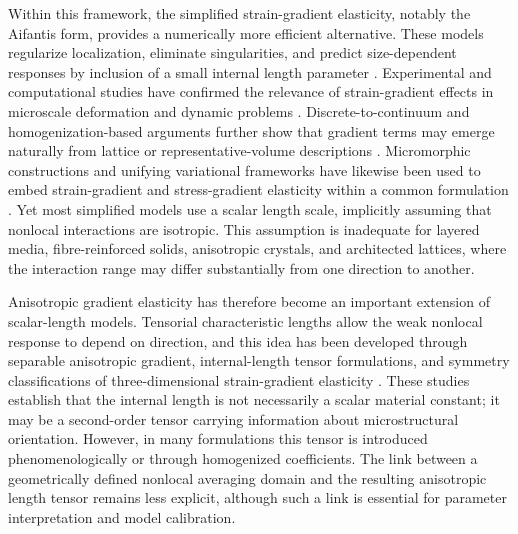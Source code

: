 \documentclass[final,3p,times,fleqn]{elsarticle}
\begin{document}
Within this framework, the simplified strain-gradient elasticity, notably the Aifantis form, provides a numerically more efficient alternative. These models regularize localization, eliminate singularities, and predict size-dependent responses by inclusion of a small internal length parameter \cite{Aifantis1992,RuAifantis1993,AltanAifantis1997}. 
Experimental and computational studies have confirmed the relevance of strain-gradient effects in microscale deformation and dynamic problems \cite{Lam2003,AskesAifantis2011}. Discrete-to-continuum and homogenization-based arguments further show that gradient terms may emerge naturally from lattice or representative-volume descriptions \cite{MetrikineAskes2002,Gitman2005}. Micromorphic constructions and unifying variational frameworks have likewise been used to embed strain-gradient and stress-gradient elasticity within a common formulation \cite{Forest2009,Polizzotto2015}. Yet most simplified models use a scalar length scale, implicitly assuming that nonlocal interactions are isotropic. This assumption is inadequate for layered media, fibre-reinforced solids, anisotropic crystals, and architected lattices, where the interaction range may differ substantially from one direction to another.

Anisotropic gradient elasticity has therefore become an important extension of scalar-length models. Tensorial characteristic lengths allow the weak nonlocal response to depend on direction, and this idea has been developed through separable anisotropic gradient, internal-length tensor formulations, and symmetry classifications of three-dimensional strain-gradient elasticity \cite{LazarPo2015,Polizzotto2018,Auffray2019}. These studies establish that the internal length is not necessarily a scalar material constant; it may be a second-order tensor carrying information about microstructural orientation. However, in many formulations this tensor is introduced phenomenologically or through homogenized coefficients. The link between a geometrically defined nonlocal averaging domain and the resulting anisotropic length tensor remains less explicit, although such a link is essential for parameter interpretation and model calibration.
\end{document}
